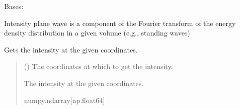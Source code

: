 \documentclass[letterpaper,10pt,english]{sphinxmanual}
\begin{document}
\begin{fulllineitems}
\label{\detokenize{source/Sources:Sources.IntensityPlaneWave}}
\pysigstartsignatures
\pysiglinewithargsret
{}
{\sphinxparamcomma {}\sphinxparamcomma {}}
{}
\pysigstopsignatures
\sphinxAtStartPar
Bases: {\hyperref[\detokenize{source/Sources:Sources.IntensitySource}]{}}

\sphinxAtStartPar
Intensity plane wave is a component of the Fourier
transform of the energy density distribution in a given volume
(e.g., standing waves)


\begin{fulllineitems}
\label{\detokenize{source/Sources:Sources.IntensityPlaneWave.get_intensity}}
\pysigstartsignatures
\pysiglinewithargsret
{}
{}
{}
\pysigstopsignatures
\sphinxAtStartPar
Gets the intensity at the given coordinates.
\begin{quote}\begin{description}
\sphinxAtStartPar
{} (\sphinxstyleliteralemphasis{\sphinxupquote{{[}}}\sphinxstyleliteralemphasis{\sphinxupquote{{]}}}) \textendash{} The coordinates at which to get the intensity.

\sphinxAtStartPar
The intensity at the given coordinates.

\sphinxAtStartPar
numpy.ndarray{[}np.float64{]}

\end{description}\end{quote}

\end{fulllineitems}


\end{fulllineitems}
\end{document}
